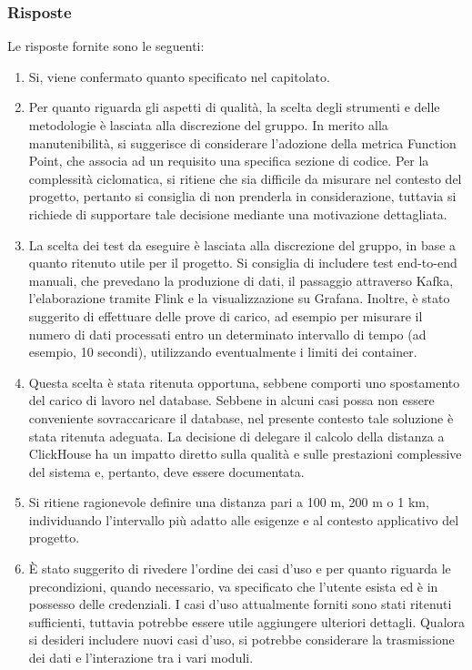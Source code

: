 \documentclass[10pt]{article}
\begin{document}
\subsubsection{Risposte}
Le risposte fornite sono le seguenti:
\begin{enumerate}
    \item Si, viene confermato quanto specificato nel capitolato.
    \item Per quanto riguarda gli aspetti di qualità, la scelta degli strumenti e delle metodologie è lasciata alla discrezione del gruppo. In merito alla manutenibilità, si suggerisce di considerare l'adozione della metrica Function Point, che associa ad un requisito una specifica sezione di codice. Per la complessità ciclomatica, si ritiene che sia difficile da misurare nel contesto del progetto, pertanto si consiglia di non prenderla in considerazione, tuttavia si richiede di supportare tale decisione mediante una motivazione dettagliata.   
    \item La scelta dei test da eseguire è lasciata alla discrezione del gruppo, in base a quanto ritenuto utile per il progetto. Si consiglia di includere test end-to-end manuali, che prevedano la produzione di dati, il passaggio attraverso Kafka, l'elaborazione tramite Flink e la visualizzazione su Grafana. Inoltre, è stato suggerito di effettuare delle prove di carico, ad esempio per misurare il numero di dati processati entro un determinato intervallo di tempo (ad esempio, 10 secondi), utilizzando eventualmente i limiti dei container.
    \item Questa scelta è stata ritenuta opportuna, sebbene comporti uno spostamento del carico di lavoro nel database. Sebbene in alcuni casi possa non essere conveniente sovraccaricare il database, nel presente contesto tale soluzione è stata ritenuta adeguata. La decisione di delegare il calcolo della distanza a ClickHouse ha un impatto diretto sulla qualità e sulle prestazioni complessive del sistema  e, pertanto, deve essere documentata.
    \item Si ritiene ragionevole definire una distanza pari a 100 m, 200 m o 1 km, individuando l'intervallo più adatto alle esigenze e al contesto applicativo del progetto.
    \item È stato suggerito di rivedere l'ordine dei casi d'uso e per quanto riguarda le precondizioni, quando necessario, va specificato che l'utente esista ed è in possesso delle credenziali. I casi d'uso attualmente forniti sono stati ritenuti sufficienti, tuttavia potrebbe essere utile aggiungere ulteriori dettagli. Qualora si desideri includere nuovi casi d'uso, si potrebbe considerare la trasmissione dei dati e l'interazione tra i vari moduli.
\end{enumerate}
\end{document}
